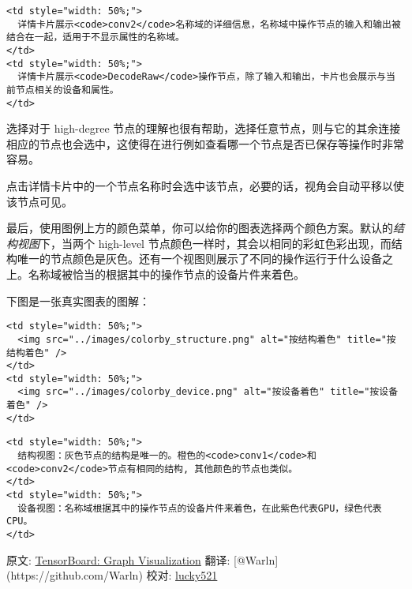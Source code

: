 \begin{verbatim}
<td style="width: 50%;">
  详情卡片展示<code>conv2</code>名称域的详细信息，名称域中操作节点的输入和输出被结合在一起，适用于不显示属性的名称域。
</td>
<td style="width: 50%;">
  详情卡片展示<code>DecodeRaw</code>操作节点，除了输入和输出，卡片也会展示与当前节点相关的设备和属性。
</td>
\end{verbatim}

选择对于 high-degree
节点的理解也很有帮助，选择任意节点，则与它的其余连接相应的节点也会选中，这使得在进行例如查看哪一个节点是否已保存等操作时非常容易。

点击详情卡片中的一个节点名称时会选中该节点，必要的话，视角会自动平移以使该节点可见。

最后，使用图例上方的颜色菜单，你可以给你的图表选择两个颜色方案。默认的\emph{结构视图}下，当两个
high-level
节点颜色一样时，其会以相同的彩虹色彩出现，而结构唯一的节点颜色是灰色。还有一个视图则展示了不同的操作运行于什么设备之上。名称域被恰当的根据其中的操作节点的设备片件来着色。

下图是一张真实图表的图解：

\begin{verbatim}
<td style="width: 50%;">
  <img src="../images/colorby_structure.png" alt="按结构着色" title="按结构着色" />
</td>
<td style="width: 50%;">
  <img src="../images/colorby_device.png" alt="按设备着色" title="按设备着色" />
</td>
\end{verbatim}

\begin{verbatim}
<td style="width: 50%;">
  结构视图：灰色节点的结构是唯一的。橙色的<code>conv1</code>和<code>conv2</code>节点有相同的结构, 其他颜色的节点也类似。
</td>
<td style="width: 50%;">
  设备视图：名称域根据其中的操作节点的设备片件来着色，在此紫色代表GPU，绿色代表CPU。
</td>
\end{verbatim}

原文:
\href{../images/index.html\#tensorboard-graph-visualization}{TensorBoard:
Graph Visualization} 翻译: {[}@Warln{]}(https://github.com/Warln) 校对:
\href{https://github.com/lucky521}{lucky521}
